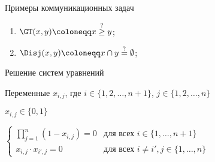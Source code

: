 \begin{frame}{Примеры коммуникационных задач}
\begin{overlayarea}{\textwidth}{10cm}
\begin{enumerate}
        \pause
        \pause
        \pause
        \pause
        \pause
            \item $\GT(x, y) \coloneqq x \stackrel{?}{\ge} y$;
            \item $\Disj(x, y) \coloneqq x \cap y \stackrel{?}{=} \emptyset$;
        \end{enumerate}
    \end{overlayarea}
\end{frame}

\begin{frame}{Решение систем уравнений}

    Переменные $x_{i, j}$, где $i \in \{1, 2, \dots, n + 1\}$, $j \in \{1, 2, \dots, n\}$

    $x_{i, j} \in \{0, 1\}$
    \vspace{0.1cm}
    
    $
    \begin{cases}
        \prod\limits_{j = 1}^{n}(1 - x_{i, j}) = 0 & \text{для всех } i \in \{1, \dots, n + 1\} \\ 
        x_{i, j} \cdot x_{i', j} = 0 & \text{для всех } i \neq i', j \in \{1, \dots, n\}
    \end{cases}
    $

    \pause

    \vspace{0.2cm}
    \begin{minipage}{0.3\linewidth}
        \centering
        
    \end{minipage}
    \pause
    \begin{minipage}{0.68\linewidth}
        \centering
        
    \end{minipage}
    
\end{frame}

